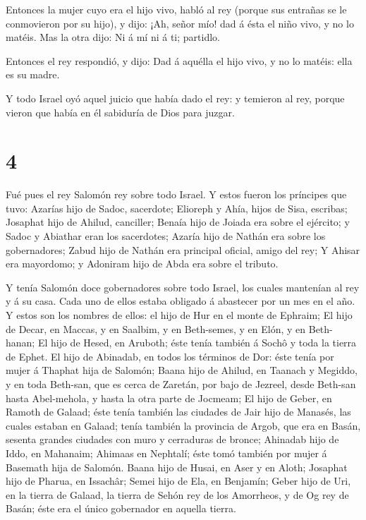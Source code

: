  Entonces la mujer cuyo era el hijo vivo, habló al rey
(porque sus entrañas se le conmovieron por su hijo), y dijo: ¡Ah, señor
mío! dad á ésta el niño vivo, y no lo matéis. Mas la otra dijo: Ni á mí
ni á ti; partidlo.

 Entonces el rey respondió, y dijo: Dad á aquélla el hijo
vivo, y no lo matéis: ella es su madre.

 Y todo Israel oyó aquel juicio que había dado el rey: y
temieron al rey, porque vieron que había en él sabiduría de Dios para
juzgar.

\hypertarget{section-3}{%
\section{4}\label{section-3}}

 Fué pues el rey Salomón rey sobre todo Israel. 
Y estos fueron los príncipes que tuvo: Azarías hijo de Sadoc, sacerdote;
 Elioreph y Ahía, hijos de Sisa, escribas; Josaphat hijo de
Ahilud, canciller;  Benaía hijo de Joiada era sobre el
ejército; y Sadoc y Abiathar eran los sacerdotes;  Azaría
hijo de Nathán era sobre los gobernadores; Zabud hijo de Nathán era
principal oficial, amigo del rey;  Y Ahisar era mayordomo; y
Adoniram hijo de Abda era sobre el tributo.

 Y tenía Salomón doce gobernadores sobre todo Israel, los
cuales mantenían al rey y á su casa. Cada uno de ellos estaba obligado á
abastecer por un mes en el año.  Y estos son los nombres de
ellos: el hijo de Hur en el monte de Ephraim;  El hijo de
Decar, en Maccas, y en Saalbim, y en Beth-semes, y en Elón, y en
Beth-hanan;  El hijo de Hesed, en Aruboth; éste tenía
también á Sochô y toda la tierra de Ephet.  El hijo de
Abinadab, en todos los términos de Dor: éste tenía por mujer á Thaphat
hija de Salomón;  Baana hijo de Ahilud, en Taanach y
Megiddo, y en toda Beth-san, que es cerca de Zaretán, por bajo de
Jezreel, desde Beth-san hasta Abel-mehola, y hasta la otra parte de
Jocmeam;  El hijo de Geber, en Ramoth de Galaad; éste tenía
también las ciudades de Jair hijo de Manasés, las cuales estaban en
Galaad; tenía también la provincia de Argob, que era en Basán, sesenta
grandes ciudades con muro y cerraduras de bronce;  Ahinadab
hijo de Iddo, en Mahanaim;  Ahimaas en Nephtalí; éste tomó
también por mujer á Basemath hija de Salomón.  Baana hijo
de Husai, en Aser y en Aloth;  Josaphat hijo de Pharua, en
Issachâr;  Semei hijo de Ela, en Benjamín; 
Geber hijo de Uri, en la tierra de Galaad, la tierra de Sehón rey de los
Amorrheos, y de Og rey de Basán; éste era el único gobernador en aquella
tierra.

